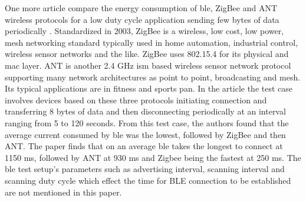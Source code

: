 One more article compare the energy consumption of \gls{ble}, ZigBee and ANT wireless protocols for a low duty cycle application sending few bytes of data periodically  \cite{Dementyev2013}. Standardized in 2003, ZigBee is a wireless, low cost, low power, mesh networking standard \cite{ZigbeeAkl} typically used in home automation, industrial control, wireless sensor networks and the like. ZigBee uses 802.15.4 for its physical and \gls{mac} layer. ANT is another 2.4 GHz \gls{ism} based wireless sensor network protocol supporting many network architectures as point to point, broadcasting and mesh. Its typical applications are in fitness and sports \gls{pan}. In the article \cite{Dementyev2013} the test case involves devices based on these three protocols initiating connection and transferring 8 bytes of data and then disconnecting periodically at an interval ranging from 5 to 120 seconds. From this test case, the authors found that the average current consumed by \gls{ble} was the lowest, followed by ZigBee and then ANT. The paper finds that on an average \gls{ble} takes the longest to connect at 1150 ms, followed by ANT at 930 ms and Zigbee being the fastest at 250 ms. The \gls{ble} test setup's parameters such as advertising interval, scanning interval and scanning duty cycle which effect the time for BLE connection to be established are not mentioned in this paper.

